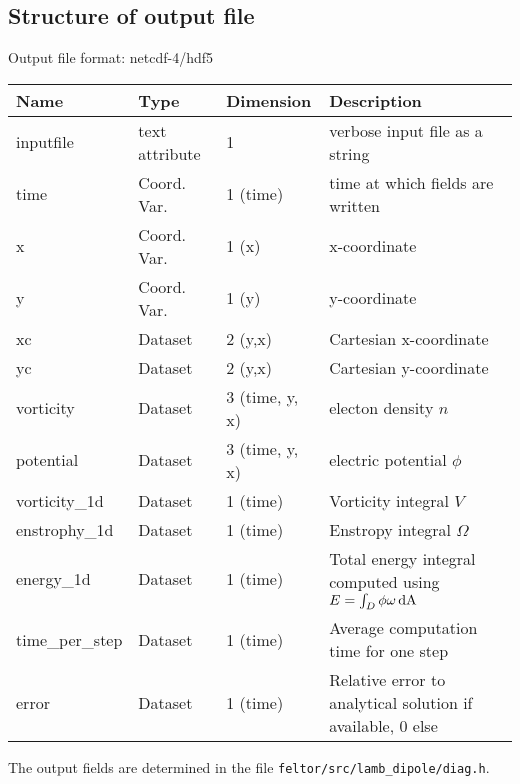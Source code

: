 \subsection{Structure of output file}
Output file format: netcdf-4/hdf5
%
\begin{longtable}{lll>{\RaggedRight}p{7cm}}
\toprule
\rowcolor{gray!50}\textbf{Name} &  \textbf{Type} & \textbf{Dimension} & \textbf{Description}  \\ \midrule
inputfile  &             text attribute & 1 & verbose input file as a string \\
time                     & Coord. Var. & 1 (time) & time at which fields are written \\
x                        & Coord. Var. & 1 (x) & x-coordinate  \\
y                        & Coord. Var. & 1 (y) & y-coordinate \\
xc                       & Dataset & 2 (y,x) & Cartesian x-coordinate  \\
yc                       & Dataset & 2 (y,x) & Cartesian y-coordinate \\
vorticity                & Dataset & 3 (time, y, x) & electon density $n$ \\
potential                & Dataset & 3 (time, y, x) & electric potential $\phi$  \\
vorticity\_1d            & Dataset & 1 (time) & Vorticity integral $V$  \\
enstrophy\_1d            & Dataset & 1 (time) & Enstropy integral $\Omega$  \\
energy\_1d               & Dataset & 1 (time) & Total energy integral computed using $E = \int_D \phi\omega \,\mathrm{dA}$ \\
time\_per\_step          & Dataset & 1 (time) & Average computation time for one step \\
error                    & Dataset & 1 (time) & Relative error to analytical solution if available, 0 else \\
\bottomrule
\end{longtable}
The output fields are determined in the file \texttt{feltor/src/lamb\_dipole/diag.h}.





